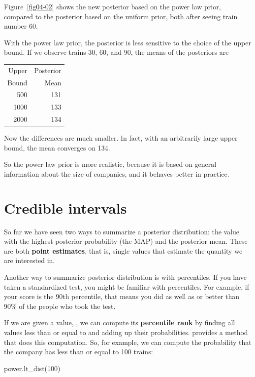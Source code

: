 \documentclass[12pt]{book}
\theoremstyle{exercise}
\begin{document}
Figure~\ref{fig04-02} shows the new posterior based on the power law prior, compared to the posterior based on the uniform prior, both after seeing train number 60.

With the power law prior, the posterior is less sensitive to the choice of the upper bound.
If we observe trains 30, 60, and 90, the means of the posteriors are

\begin{tabular}{rr}
\toprule
Upper & Posterior \\
Bound & Mean \\
\midrule
  500 & 131 \\
  1000 & 133 \\
  2000 & 134 \\
\bottomrule
\end{tabular}

Now the differences are much smaller.  In fact,
with an arbitrarily large upper bound, the mean converges on 134.

So the power law prior is more realistic, because it is based on
general information about the size of companies, and it behaves better in practice.


\section{Credible intervals}
\label{credible}

So far we have seen two ways to summarize a posterior distribution: the value with the highest posterior probability (the MAP) and the posterior mean.
These are both {\bf point estimates}, that is, single values that estimate the quantity we are interested in.

Another way to summarize posterior distribution is with percentiles.
If you have taken a standardized test, you might be familiar with percentiles.
For example, if your score is the 90th percentile, that means you did as well as or better than 90\% of the people who took the test.

If we are given a value, , we can compute its {\bf percentile rank} by finding all values less than or equal to  and adding up their probabilities.
 provides a method that does this computation.
So, for example, we can compute the probability that the company has less than or equal to 100 trains:

\begin{code}
power.lt_dist(100)
\end{code}
\end{document}

